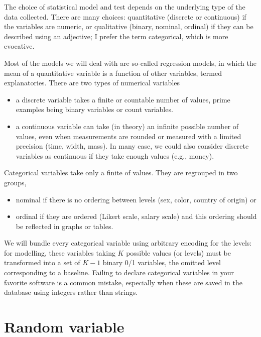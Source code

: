 \documentclass[
  11pt,
  letterpaper,
]{scrbook}
\providecommand{\tightlist}{%
  \setlength{\itemsep}{0pt}\setlength{\parskip}{0pt}}\usepackage{longtable,booktabs,array}
\theoremstyle{plain}
\theoremstyle{definition}
\theoremstyle{definition}
\theoremstyle{remark}
\begin{document}
The choice of statistical model and test depends on the underlying type
of the data collected. There are many choices: quantitative (discrete or
continuous) if the variables are numeric, or qualitative (binary,
nominal, ordinal) if they can be described using an adjective; I prefer
the term categorical, which is more evocative.

Most of the models we will deal with are so-called regression models, in
which the mean of a quantitative variable is a function of other
variables, termed explanatories. There are two types of numerical
variables

\begin{itemize}
\tightlist
\item
  a discrete variable takes a finite or countable number of values,
  prime examples being binary variables or count variables.
\item
  a continuous variable can take (in theory) an infinite possible number
  of values, even when measurements are rounded or measured with a
  limited precision (time, width, mass). In many case, we could also
  consider discrete variables as continuous if they take enough values
  (e.g., money).
\end{itemize}

Categorical variables take only a finite of values. They are regrouped
in two groups,

\begin{itemize}
\tightlist
\item
  nominal if there is no ordering between levels (sex, color, country of
  origin) or
\item
  ordinal if they are ordered (Likert scale, salary scale) and this
  ordering should be reflected in graphs or tables.
\end{itemize}

We will bundle every categorical variable using arbitrary encoding for
the levels: for modelling, these variables taking \(K\) possible values
(or levels) must be transformed into a set of \(K-1\) binary 0/1
variables, the omitted level corresponding to a baseline. Failing to
declare categorical variables in your favorite software is a common
mistake, especially when these are saved in the database using integers
rather than strings.

\section{Random variable}\label{random-variable}
\end{document}
